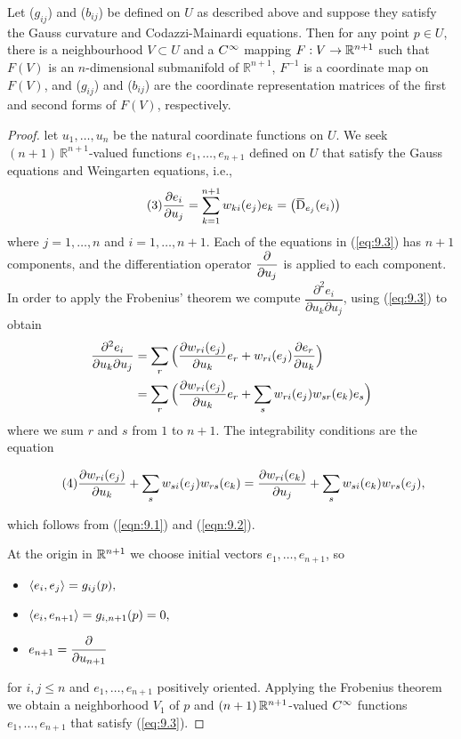 \documentclass[../main]{subfiles}
\begin{document}
\begin{theorem} \label{thm:ch9.2.1} %
Let ($g_{ij}$) and ($b_{ij}$)  be defined on $U$ as described above and suppose they satisfy the Gauss curvature and Codazzi-Mainardi equations. Then for any point $p \in U$, there is a neighbourhood $V \subset U$ and a $C^\infty$ mapping $F: V \to \mathbb{R}^{n+1}$ such that $F(V)$ is an $n$-dimensional submanifold of $\mathbb{R}^{n+1}$, $F^{-1}$ is a coordinate map on $F(V)$, and ($g_{ij}$) and ($b_{ij}$) are the coordinate representation matrices of the first and second forms of $F(V)$, respectively.
\end{theorem}

\begin{proof}
let $u_1, \dots , u_n$ be the natural coordinate functions on $U$.
We seek \newline $(n+1)\, \mathbb{R}^{n+1}$-valued functions $e_1 ,\dots, e_{n+1}$ defined on $U$ that satisfy the Gauss equations and Weingarten equations, i.e.,
\[\tag{3}\label{eq:9.3}\pdv{e_i}{u_j} = \sum_{k=1}^{n+1} w_{ki}(e_j)e_k = \big(\covariant_{e_j}(e_i)\big) \]
where $j=1, \ldots, n$ and $i=1, \ldots, n+1$. Each of the equations in (\ref{eq:9.3}) has $n+1$ components, and the differentiation operator $\dfrac{\partial }{\partial u_j}$ is applied to each component. In order to apply the Frobenius' theorem we compute $\dfrac{\partial^{2} e_{i}}{\partial u_{k} \partial u_{j}}$, using (\ref{eq:9.3}) to obtain
\begin{align*}
\dfrac{\partial^{2} e_{i}}{\partial u_{k} \partial u_{j}} &= \sum_r \Big(\dfrac{\partial w_{ri}(e_j)}{\partial u_k}e_r+w_{ri}(e_j)\dfrac{\partial e_r}{\partial u_k}\Big)\\
 &= \sum_r \Big(\dfrac{\partial w_{ri}(e_j)}{\partial u_k}e_r +\sum_s w_{ri}(e_j)w_{sr}(e_k)e_s\Big)
\end{align*}
where we sum $r$ and $s$ from $1$ to $n+1$. The integrability conditions are the equation

\[\tag{4}\label{eq:9.4} \dfrac{\partial w_{ri}(e_j)}{\partial u_k} +\sum_s w_{si}(e_j)w_{rs}(e_k) = \dfrac{\partial w_{ri}(e_k)}{\partial u_j}+\sum_s w_{si}(e_k)w_{rs}(e_j),\]

which follows from (\ref{eqn:9.1}) and (\ref{eqn:9.2}). 

At the origin in $\mathbb{R}^{n+1}$ we choose initial vectors $e_{1}, \ldots, e_{n+1}$, so
\begin{itemize}
    \item $\left\langle e_{i},e_{j}\right\rangle=g_{i j}(p), $
    \item $\left\langle e_i,e_{n+1}\right\rangle = g_{i,n+1}(p)=0,$
    \item $e_{n+1} = \dfrac{\partial }{\partial u_{n+1}}$
\end{itemize}
for $i, j \leq n$ and $e_{1}, \ldots, e_{n+1}$ positively oriented. Applying the Frobenius theorem we obtain a neighborhood $V_{1}$ of $p$ and $(n+1)\, \mathbb{R}^{n+1}$-valued $C^\infty$ functions $e_{1}, \ldots, e_{n+1}$ that satisfy (\ref{eq:9.3}).


\end{proof}
\end{document}
